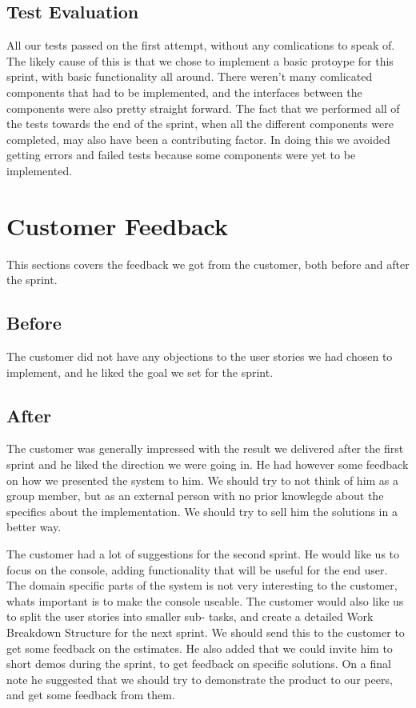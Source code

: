 \subsection{Test Evaluation}
All our tests passed on the first attempt, without any comlications to speak of. The likely cause of this is that we chose to implement a basic protoype for this sprint, with basic functionality all around. There weren't many comlicated components that had to be implemented, and the interfaces between the components were also pretty straight forward. The fact that we performed all of the tests towards the end of the sprint, when all the different components were completed, may also have been a contributing factor. In doing this we avoided getting errors and failed tests because some components were yet to be implemented.

\section{Customer Feedback}
This sections covers the feedback we got from the customer, both before and after the sprint.

\subsection{Before}
The customer did not have any objections to the user stories we had chosen to implement, and he liked the goal we set for the sprint.

\subsection{After}
The customer was generally impressed with the result we delivered after the first sprint and he liked the direction we were going in. He had however some feedback on how we presented the system to him. We should try to not think of him as a group member, but as an external person with no prior knowlegde about the specifics about the implementation. We should try to sell him the solutions in a better way.

The customer had a lot of suggestions for the second sprint. He would like us to focus on the console, adding functionality that will be useful for the end user. The domain specific parts of the system is not very interesting to the customer, whats important is to make the console useable. The customer would also like us to split the user stories into smaller sub- tasks, and create a detailed Work Breakdown Structure for the next sprint. We should send this to the customer to get some feedback on the estimates. He also added that we could invite him to short demos during the sprint, to get feedback on specific solutions. On a final note he suggested that we should try to demonstrate the product to our peers, and get some feedback from them.


